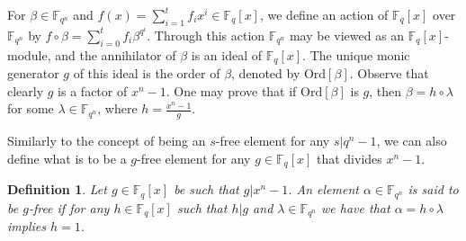\documentclass[12pt]{article}
\newtheorem{defin}[theorem]{Definition}
\newenvironment{definition}{\begin{defin}\em}{\end{defin}}
\newtheorem{rem}[theorem]{Remark}
\newenvironment{remark}{\begin{rem}\em}{\end{rem}}
\newcommand{\F}{\mathbb{F}}
\begin{document}
%
%
%
%
%
%
%
%
%
%
%
%
%


For $\beta \in \mathbb{F}_{q^n}$ and $\displaystyle 
f(x) = \sum_{i=1}^{t} f_i x^i\in \F_q[x]$, we define an action of 
$\mathbb{F}_q[x]$ over $\mathbb{F}_{q^n}$ by $\displaystyle f \circ \beta = 
\sum_{i=0}^{t} f_i \beta^{q^i}$. 
Through this action $\mathbb{F}_{q^n}$ may be viewed as an $\mathbb{F}_q[x]$-module, and the
annihilator of $\beta$ is an ideal of  $\mathbb{F}_q[x]$.
 The unique monic generator  $g$ of this ideal is the order of $\beta$, denoted by $\mbox{Ord}[\beta]$.
 Observe that clearly $g$ is a factor of $x^n - 1$.
One may prove that if $\mbox{Ord}[\beta]$ is $g$, then $\beta = h \circ \lambda$ for some $\lambda \in \mathbb{F}_{q^n}$, where $h=\frac{x^n-1}{g}$. 

Similarly  to the concept of being an $s$-free element for any $s|q^n-1$, we 
can also define what is to be a $g$-free element for any $g \in 
\mathbb{F}_q[x]$ that divides $x^n-1$.

\begin{definition} \label{g-free}
Let $g \in \mathbb{F}_q[x]$ be such that $g|x^n-1$. An element $\alpha \in 
\mathbb{F}_{q^n}$ is said to be {\em $g$-free} if for any $h \in 
\mathbb{F}_q[x]$ such that $h|g$ and $\lambda \in \mathbb{F}_{q^n}$ we have 
that   $\alpha = h \circ \lambda$ implies $h=1$.
\end{definition}
\end{document}
